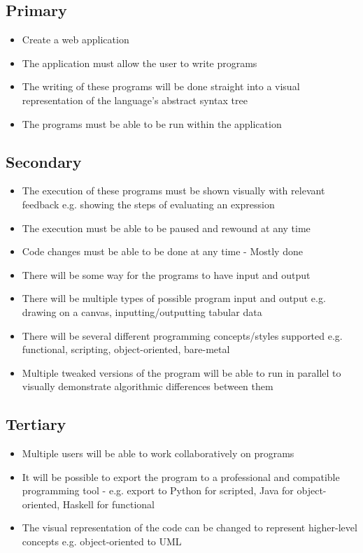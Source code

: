 \subsection{Primary}

\begin{itemize}
\item Create a web application
\item The application must allow the user to write programs
\item The writing of these programs will be done straight into a visual representation of the language's abstract syntax tree
\item The programs must be able to be run within the application
\end{itemize}

\subsection{Secondary}

\begin{itemize}
\item The execution of these programs must be shown visually with relevant feedback
\subitem e.g. showing the steps of evaluating an expression
\item The execution must be able to be paused and rewound at any time
\item Code changes must be able to be done at any time - Mostly done
\item There will be some way for the programs to have input and output
\item There will be multiple types of possible program input and output
\subitem e.g. drawing on a canvas, inputting/outputting tabular data
\item There will be several different programming concepts/styles supported
\subitem e.g. functional, scripting, object-oriented, bare-metal
\item Multiple tweaked versions of the program will be able to run in parallel to visually demonstrate algorithmic differences between them
\end{itemize}
\subsection{Tertiary}

\begin{itemize}
\item Multiple users will be able to work collaboratively on programs
\item It will be possible to export the program to a professional and compatible programming tool
\subitem - e.g. export to Python for scripted, Java for object-oriented, Haskell for functional
\item The visual representation of the code can be changed to represent higher-level concepts
\subitem e.g. object-oriented to UML
\end{itemize}